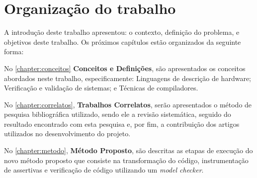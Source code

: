 % 

\section{Organização do trabalho}
A introdução deste trabalho apresentou: o contexto, definição do problema, e objetivos deste trabalho. Os próximos capítulos estão organizados da seguinte forma:

\par
No \autoref{chapter:conceitos} \textbf{Conceitos e Definições}, são apresentados os conceitos abordados neste trabalho, especificamente: Linguagens de descrição de hardware; Verificação e validação de sistemas; e Técnicas de compiladores.

\par
No \autoref{chapter:correlatos}, \textbf{Trabalhos Correlatos}, serão apresentados o método de pesquisa bibliográfica utilizado, sendo ele a revisão sistemática, seguido do resultado encontrado com esta pesquisa e, por fim, a contribuição dos artigos utilizados no desenvolvimento do projeto. 

\par
No \autoref{chapter:metodo}, \textbf{Método Proposto}, são descritas as etapas de execução do novo método proposto que consiste na transformação do código, instrumentação de assertivas e verificação de código utilizando um \textit{model checker}.


